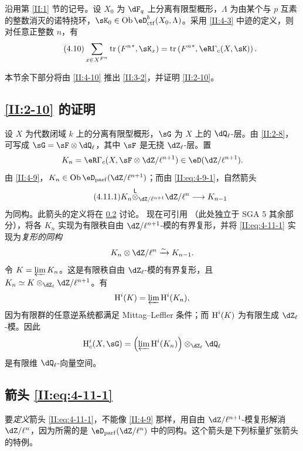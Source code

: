 \begin{theorem_}\label{II:4-10}
沿用第 \ref{II:1} 节的记号。设 $X_0$ 为 $\dF_q$ 上分离有限型概形，$\Lambda$ 为由某个与 $p$ 互素的整数消灭的诺特挠环，$\sK_0\in\ob\eD_{\mathrm{ctf}}^b(X_0,\Lambda)$。采用 \ref{II:4-3} 中迹的定义，则对任意正整数 $n$，有
\begin{equation*}\tag{4.10}\label{II:eq:4-10}
\sum_{x\in X^{F^n}}\tr\left({F^n}^*,\sK_x\right)=\tr\left({F^n}^*,\eR\Gamma_c(X,\sK)\right).
\end{equation*}
\end{theorem_}
本节余下部分将由 \ref{II:4-10} 推出 \ref{II:3-2}，并证明 \ref{II:2-10}。

\subsection{\texorpdfstring{\ref{II:2-10}}{2.10} 的证明}\label{II:4-11}
设 $X$ 为代数闭域 $k$ 上的分离有限型概形，$\sG$ 为 $X$ 上的 $\dQ_\ell$-层。由 \ref{II:2-8}，可写成 $\sG=\sF\otimes\dQ_\ell$，其中 $\sF$ 是无挠 $\dZ_\ell$-层。置
\[K_n=\eR\Gamma_c(X,\sF\otimes\dZ/\ell^{n+1})\in\eD(\dZ/\ell^{n+1}).\]
由 \ref{II:4-9}，$K_n\in\ob\eD_{\mathrm{parf}}(\dZ/\ell^{n+1})$；而由 \eqref{II:eq:4-9-1}，自然箭头
\begin{equation*}\tag{4.11.1}\label{II:eq:4-11-1}
K_n\lotimes_{\dZ/\ell^{n+1}}\dZ/\ell^n\longrightarrow K_{n-1}
\end{equation*}
为同构。此箭头的定义将在 \ref{II:4-12} 讨论。
现在可引用 \cite[XV 3.3，第31页末尾的1--2]{sga5}（此处独立于 SGA 5 其余部分），将各 $K_n$ 实现为有限秩自由 $\dZ/\ell^{n+1}$-模的有界复形，并将 \eqref{II:eq:4-11-1} 实现为\emph{复形的同构}
\[K_n\otimes\dZ/\ell^n\iso K_{n-1}.\]
令 $K=\varprojlim K_n$。这是有限秩自由 $\dZ_\ell$-模的有界复形，且 $K_n\simeq K\otimes_{\dZ_\ell}\dZ/\ell^{n+1}$。有
\[\operatorname{H}^i(K)=\varprojlim\operatorname{H}^i(K_n),\]
因为有限群的任意逆系统都满足 Mittag--Leffler 条件；而 $\operatorname{H}^i(K)$ 为有限生成 $\dZ_\ell$-模。因此
\[\h_c^i(X,\sG)=\left(\varprojlim\h^i(K_n)\right)\otimes_{\dZ_\ell}\dQ_\ell\]
是有限维 $\dQ_\ell$-向量空间。

\subsection{箭头 \texorpdfstring{\eqref{II:eq:4-11-1}}{(4.11.1)}}\label{II:4-12}
要\emph{定义}箭头 \eqref{II:eq:4-11-1}，不能像 \ref{II:4-9} 那样，用自由 $\dZ/\ell^{n+1}$-模复形解消 $\dZ/\ell^n$，因为所需的是 $\eD_{\mathrm{parf}}(\dZ/\ell^n)$ 中的同构。这个箭头是下列标量扩张箭头的特例。


